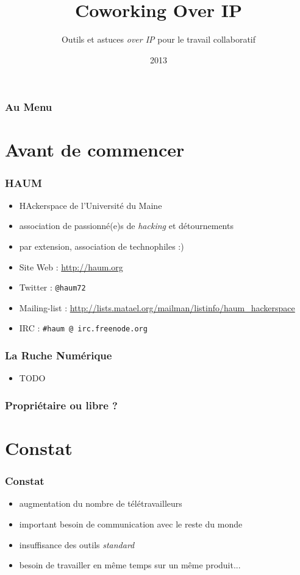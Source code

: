 \documentclass{beamer}
\title[Coworking-oIP]{Coworking Over IP}
\author{Outils et astuces \textit{over IP} pour le travail collaboratif}
\institute{Mathieu (matael) Gaborit | HAUM | Ruche Numérique}
\date{2013}
\begin{document}
\begin{frame}
\titlepage
\end{frame}

\begin{frame}
\frametitle{Au Menu}
\tableofcontents
\end{frame}

\section{Avant de commencer} %

\begin{frame}
    \frametitle{HAUM}

    \begin{itemize}
        \item HAckerspace de l'Université du Maine
        \item association de passionné(e)s de \textit{hacking} et détournements
        \item par extension, association de technophiles :)
        \item Site Web : \url{http://haum.org}
        \item Twitter : \texttt{@haum72}
        \item Mailing-list : \url{http://lists.matael.org/mailman/listinfo/haum_hackerspace}
        \item IRC : \texttt{\#haum @ irc.freenode.org}
    \end{itemize}
\end{frame}

\begin{frame}
    \frametitle{La Ruche Numérique}

    \begin{itemize}
        \item TODO
    \end{itemize}
\end{frame}

\begin{frame}
    \frametitle{Propriétaire ou libre ?} 
\end{frame}

\section{Constat}

\begin{frame}
    \frametitle{Constat}

    \begin{itemize}[<+->]
        \item augmentation du nombre de télétravailleurs
        \item important besoin de communication avec le reste du monde
        \item insuffisance des outils \textit{standard}
        \item besoin de travailler en même temps sur un même produit...
    \end{itemize}
\end{frame}
\end{document}
